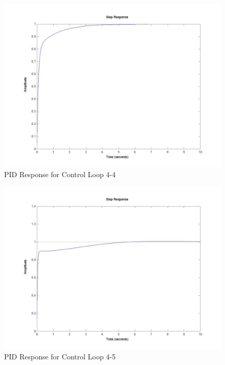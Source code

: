 	\begin{figure}[H]
		\includegraphics[width=\textwidth]{part4-4.jpg}
		\caption{PID Response for Control Loop 4-4}
	\end{figure}
	
	\begin{figure}[H]
		\includegraphics[width=\textwidth]{part4-5.jpg}
		\caption{PID Response for Control Loop 4-5}
	\end{figure}
	
